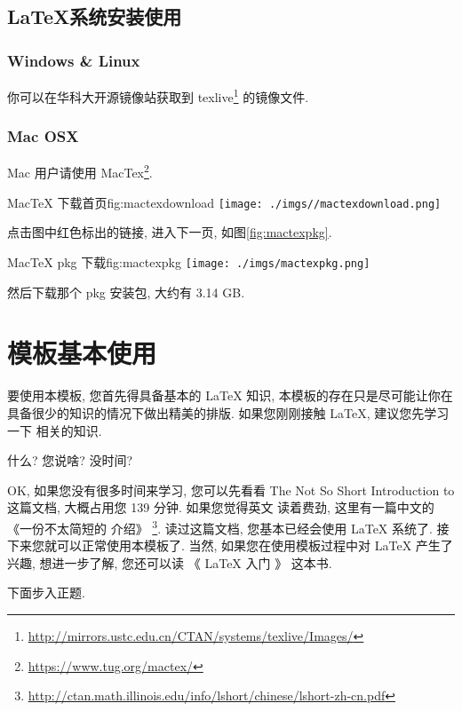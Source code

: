 \documentclass[bibsec, doctor, tabtoc, figtoc]{cugthesis}
\begin{document}
\subsection{\LaTeX{}系统安装使用}
\label{sub:xi_tong_an_zhuang_shi_yong_}
\subsubsection{Windows \& Linux}
\label{ssub:Windows_Linux}
你可以在华科大开源镜像站获取到 texlive\footnote{\url{http://mirrors.ustc.edu.cn/CTAN/systems/texlive/Images/}}
的镜像文件.

\subsubsection{Mac OSX}
\label{ssub:Mac_OSX}
Mac 用户请使用 MacTex\footnote{\url{https://www.tug.org/mactex/}}.

\begin{tfig}{MacTeX 下载首页}{fig:mactexdownload}
\texttt{[image: ./imgs//mactexdownload.png]}
\end{tfig}

点击图中红色标出的链接, 进入下一页, 如图\ref{fig:mactexpkg}.

\begin{tfig}{MacTeX pkg 下载}{fig:mactexpkg}
\texttt{[image: ./imgs/mactexpkg.png]}
\end{tfig}

然后下载那个 pkg 安装包, 大约有 3.14 GB\@.
\section{模板基本使用}
\label{sec:mo_ban_ji_ben_shi_yong_}
要使用本模板, 您首先得具备基本的 \LaTeX{} 知识, 本模板的存在只是尽可能让你在
具备很少的知识的情况下做出精美的排版. 如果您刚刚接触 \LaTeX{}, 建议您先学习一下
相关的知识.

什么? 您说啥? 没时间?

OK, 如果您没有很多时间来学习, 您可以先看看 The Not So Short Introduction to
\LaTeXe{} \cite{oetiker_not_2018} 这篇文档, 大概占用您 139 分钟. 如果您觉得英文
读着费劲, 这里有一篇中文的《一份不太简短的 \LaTeXe{} 介绍》
\footnote{\url{http://ctan.math.illinois.edu/info/lshort/chinese/lshort-zh-cn.pdf}}.
读过这篇文档, 您基本已经会使用 \LaTeX{} 系统了. 接下来您就可以正常使用本模板了.
当然, 如果您在使用模板过程中对 \LaTeX{} 产生了兴趣, 想进一步了解, 您还可以读
《 \LaTeX{} 入门 》\cite{_latex_2013} 这本书.

下面步入正题.
\end{document}
